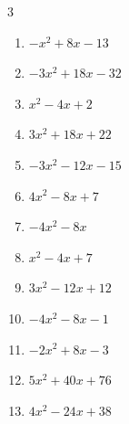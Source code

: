 \begin{multicols}{3}
\begin{enumerate}

  \item $-x^{2}+8x-13$


  \item $-3x^{2}+18x-32$


  \item $x^{2}-4x+2$


  \item $3x^{2}+18x+22$


  \item $-3x^{2}-12x-15$


  \item $4x^{2}-8x+7$


  \item $-4x^{2}-8x$


  \item $x^{2}-4x+7$


  \item $3x^{2}-12x+12$


\columnbreak %

  \item $-4x^{2}-8x-1$


  \item $-2x^{2}+8x-3$


  \item $5x^{2}+40x+76$


  \item $4x^{2}-24x+38$



\end{enumerate}
\end{multicols}
